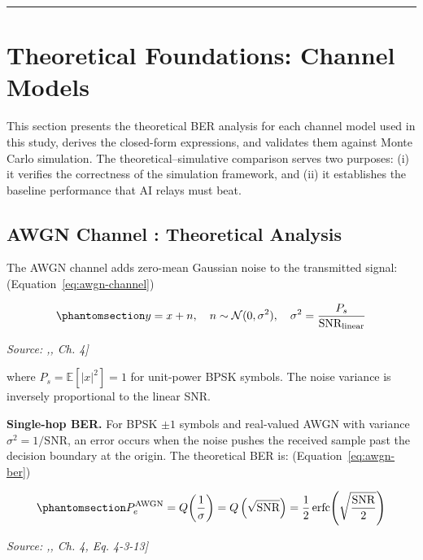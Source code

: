 \begin{center}\rule{0.5\linewidth}{0.5pt}\end{center}

\section{Theoretical Foundations: Channel Models}\label{sec:theoretical-foundations-channel-models}

This section presents the theoretical BER analysis for each channel model used in this study, derives the closed-form expressions, and validates them against Monte Carlo simulation. The theoretical--simulative comparison serves two purposes: (i) it verifies the correctness of the simulation framework, and (ii) it establishes the baseline performance that AI relays must beat.

\subsection{AWGN Channel : Theoretical Analysis}\label{sec:awgn-channel-theoretical-analysis}

The AWGN channel adds zero-mean Gaussian noise to the transmitted signal: (Equation~\ref{eq:awgn-channel})

\begin{equation}\protect\phantomsection\label{eq:awgn-channel}{y = x + n, \quad n \sim \mathcal{N}(0, \sigma^2), \quad \sigma^2 = \frac{P_s}{\text{SNR}_{\text{linear}}}
}\end{equation}\par{\small\textit{Source: \cite{ProakisSalehi2008DigitalComm},, Ch. 4]}}

where \(P_s = \mathbb{E}[|x|^2] = 1\) for unit-power BPSK symbols. The noise variance is inversely proportional to the linear SNR.

\textbf{Single-hop BER.} For BPSK \(\pm 1\) symbols and real-valued AWGN with variance \(\sigma^2 = 1/\text{SNR}\), an error occurs when the noise pushes the received sample past the decision boundary at the origin. The theoretical BER is: (Equation~\ref{eq:awgn-ber})

\begin{equation}\protect\phantomsection\label{eq:awgn-ber}{P_e^{\text{AWGN}} = Q\!\left(\frac{1}{\sigma}\right) = Q\left(\sqrt{\text{SNR}}\right) = \frac{1}{2}\,\text{erfc}\!\left(\sqrt{\frac{\text{SNR}}{2}}\right)
}\end{equation}\par{\small\textit{Source: \cite{ProakisSalehi2008DigitalComm},, Ch. 4, Eq. 4-3-13]}}

